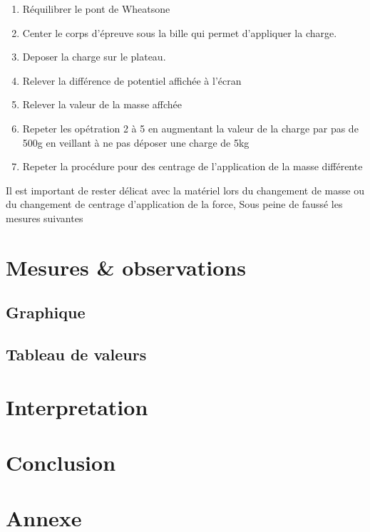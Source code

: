 \documentclass[11pt,a4paper]{report}
\begin{document}
\begin{enumerate}
\item Réquilibrer le pont de Wheatsone
\item Center le corps d'épreuve sous la bille qui permet d'appliquer la charge.
\item Deposer la charge sur le plateau.
\item Relever la différence de potentiel affichée à l'écran
\item Relever la valeur de la masse affchée
\item Repeter les opétration 2 à 5 en augmentant la valeur de la charge par pas de 500g en veillant à ne pas déposer une charge de 5kg
\item Repeter la procédure pour des centrage de l'application de la masse différente
\end{enumerate}
Il est important de rester délicat avec la matériel lors du changement de masse ou du changement de centrage d'application de la force, Sous peine de faussé les mesures suivantes
\chapter{Mesures \& observations}
\section{Graphique}
\section{Tableau de valeurs}

	
\chapter{Interpretation}	
\chapter{Conclusion}	
\chapter{Annexe}	
\end{document}
